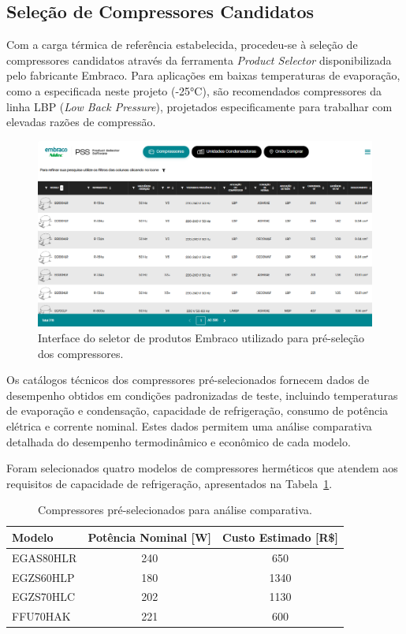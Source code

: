 \subsection{Seleção de Compressores Candidatos}

Com a carga térmica de referência estabelecida, procedeu-se à seleção de compressores candidatos através da ferramenta \textit{Product Selector} disponibilizada pelo fabricante Embraco. Para aplicações em baixas temperaturas de evaporação, como a especificada neste projeto (-25°C), são recomendados compressores da linha LBP (\textit{Low Back Pressure}), projetados especificamente para trabalhar com elevadas razões de compressão.

\begin{figure}[ht]
    \centering
    \includegraphics[width=0.8\linewidth]{Imagens/Desenvolvimento/PSS-embraco.png}
    \caption{Interface do seletor de produtos Embraco utilizado para pré-seleção dos compressores.}
    \label{fig:seletor de produtos}
\end{figure}

Os catálogos técnicos dos compressores pré-selecionados fornecem dados de desempenho obtidos em condições padronizadas de teste, incluindo temperaturas de evaporação e condensação, capacidade de refrigeração, consumo de potência elétrica e corrente nominal. Estes dados permitem uma análise comparativa detalhada do desempenho termodinâmico e econômico de cada modelo.

Foram selecionados quatro modelos de compressores herméticos que atendem aos requisitos de capacidade de refrigeração, apresentados na Tabela~\ref{tab:compressores escolhidos}.

\begin{table}[ht]
\centering
\begin{tabular}{|l|c|c|}
\hline
\textbf{Modelo} & \textbf{Potência Nominal [W]} & \textbf{Custo Estimado [R\$]} \\ \hline
EGAS80HLR & 240 & 650 \\ \hline
EGZS60HLP & 180 & 1340 \\ \hline
EGZS70HLC & 202 & 1130 \\ \hline
FFU70HAK & 221 & 600 \\ \hline
\end{tabular}
\caption{Compressores pré-selecionados para análise comparativa.}
\label{tab:compressores escolhidos}
\end{table}

